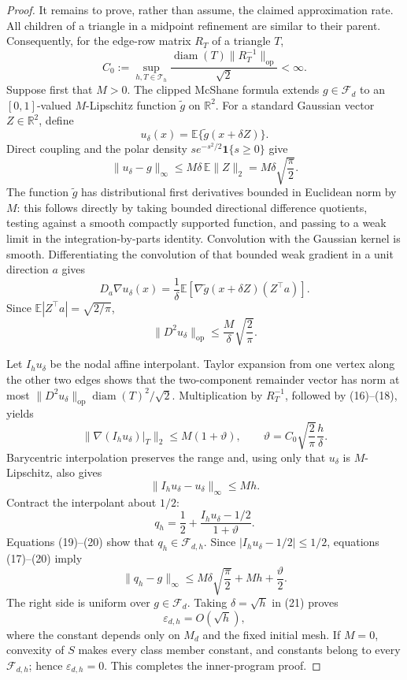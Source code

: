 \documentclass{article}
\begin{document}
\begin{proof}
It remains to prove, rather than assume, the claimed approximation rate.  All
children of a triangle in a midpoint refinement are similar to their parent.
Consequently, for the edge-row matrix \(R_T\) of a triangle \(T\),
\[
 C_0:=\sup_{h,T\in\mathcal T_h}
       \frac{\operatorname{diam}(T)\|R_T^{-1}\|_{\mathrm{op}}}{\sqrt2}<\infty.
                                                                    \tag{16}
\]
Suppose first that \(M>0\).  The clipped McShane formula extends
\(g\in\mathcal F_d\) to an \([0,1]\)-valued \(M\)-Lipschitz function
\(\widetilde g\) on \(\mathbb R^2\).  For a standard Gaussian vector
\(Z\in\mathbb R^2\), define
\[
 u_\delta(x)=\mathbb E\{\widetilde g(x+\delta Z)\}.
\]
Direct coupling and the polar density
\(s e^{-s^2/2}\mathbf 1\{s\ge0\}\) give
\[
 \|u_\delta-g\|_\infty
 \le M\delta\,\mathbb E\|Z\|_2
 =M\delta\sqrt{\frac\pi2}.                                \tag{17}
\]
The function \(\widetilde g\) has distributional first derivatives bounded in
Euclidean norm by \(M\): this follows directly by taking bounded directional
difference quotients, testing against a smooth compactly supported function,
and passing to a weak limit in the integration-by-parts identity.  Convolution
with the Gaussian kernel is smooth.  Differentiating the convolution of that
bounded weak gradient in a unit direction \(a\) gives
\[
 D_a\nabla u_\delta(x)
 =\frac1\delta\mathbb E\!\left[
       \nabla\widetilde g(x+\delta Z)(Z^\top a)\right].
\]
Since \(\mathbb E|Z^\top a|=\sqrt{2/\pi}\),
\[
 \|D^2u_\delta\|_{\mathrm{op}}
 \le\frac{M}{\delta}\sqrt{\frac2\pi}.                     \tag{18}
\]

Let \(I_hu_\delta\) be the nodal affine interpolant.  Taylor expansion from one
vertex along the other two edges shows that the two-component remainder vector
has norm at most
\(\|D^2u_\delta\|_{\mathrm{op}}\operatorname{diam}(T)^2/\sqrt2\).
Multiplication by \(R_T^{-1}\), followed by (16)--(18), yields
\[
 \|\nabla(I_hu_\delta)|_T\|_2\le M(1+\vartheta),
 \qquad
 \vartheta=C_0\sqrt{\frac2\pi}\frac h\delta.              \tag{19}
\]
Barycentric interpolation preserves the range and, using only that
\(u_\delta\) is \(M\)-Lipschitz, also gives
\[
 \|I_hu_\delta-u_\delta\|_\infty\le Mh.                    \tag{20}
\]
Contract the interpolant about \(1/2\):
\[
 q_h=\frac12+\frac{I_hu_\delta-1/2}{1+\vartheta}.
\]
Equations (19)--(20) show that \(q_h\in\mathcal F_{d,h}\).  Since
\(|I_hu_\delta-1/2|\le1/2\), equations (17)--(20) imply
\[
 \|q_h-g\|_\infty
 \le M\delta\sqrt{\frac\pi2}+Mh+\frac{\vartheta}{2}.       \tag{21}
\]
The right side is uniform over \(g\in\mathcal F_d\).  Taking
\(\delta=\sqrt h\) in (21) proves
\[
 \varepsilon_{d,h}=O(\sqrt h),                              \tag{22}
\]
where the constant depends only on \(M_d\) and the fixed initial mesh.  If
\(M=0\), convexity of \(S\) makes every class member constant, and constants
belong to every \(\mathcal F_{d,h}\); hence
\(\varepsilon_{d,h}=0\).  This completes the inner-program proof.


\end{proof}
\end{document}
